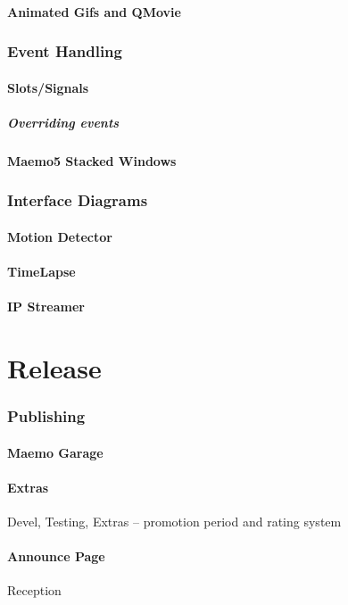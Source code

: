 \documentclass[11pt]{article} %
\begin{document}
\subsection{Animated Gifs and QMovie}
\section{Event Handling}
\subsection{Slots/Signals}
\subsubsection{Overriding events}
\subsection{Maemo5 Stacked Windows}
\section{Interface Diagrams}
\subsection{Motion Detector}
\subsection{TimeLapse}
\subsection{IP Streamer}

\part{Release}
\section{Publishing}
\subsection{Maemo Garage}
\subsection{Extras}{Devel, Testing, Extras -- promotion period and rating system}
\subsection{Announce Page}{Reception}
\end{document}
